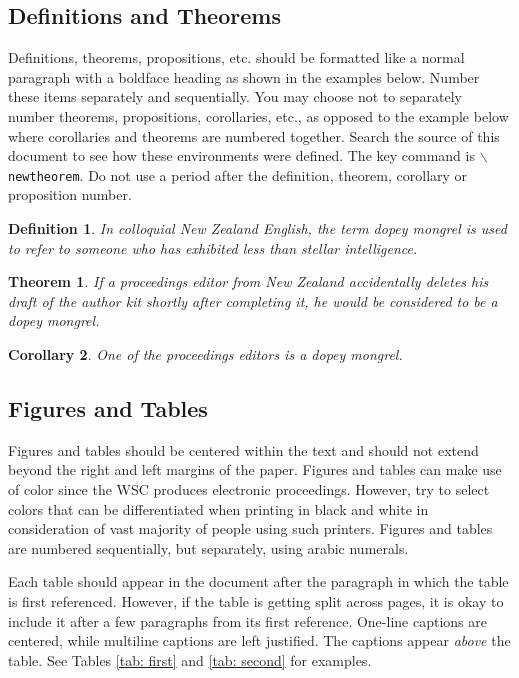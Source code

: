 \documentclass{wscpaperproc}
\theoremstyle{wsc}
\newtheorem{theorem}{Theorem}
\newtheorem{corollary}[theorem]{Corollary}
\newtheorem{definition}{Definition}
\begin{document}
\subsection{Definitions and Theorems}
Definitions, theorems, propositions, etc. should be formatted like a normal paragraph with a boldface heading as shown in the examples below. Number
these items separately and sequentially. You may choose not to separately number theorems, propositions, corollaries, etc., as opposed to the example below where corollaries and theorems are numbered together. Search the source of this document to see how these environments were defined. The key
command is {\tt $\backslash$newtheorem}. Do not use a period after the definition, theorem, corollary or proposition number.

\begin{definition}
In colloquial New Zealand English, the term {\em dopey mongrel} is used to refer to someone who has exhibited less than stellar intelligence.
\end{definition}

\begin{theorem}
If a proceedings editor from New Zealand accidentally deletes his draft of the author kit shortly after completing it, he would be considered to be a dopey mongrel.
\end{theorem}

\begin{corollary}
One of the proceedings editors is a dopey mongrel.
\end{corollary}

\subsection{Figures and Tables}
\label{sec:graphics}
Figures and tables should be centered within the text and should not extend beyond the right and left margins of the paper.
Figures and tables can make use of color since the WSC produces electronic proceedings.
However, try to select colors that can be differentiated when printing in black and white in consideration of vast majority of people using such printers.
Figures and tables are numbered sequentially, but separately, using arabic numerals.

Each table should appear in the document after the paragraph in which the table is first referenced. However, if the table is getting split across pages, it is okay to include it after a few paragraphs from its first reference.
One-line captions are centered, while multiline captions are left justified.
The captions appear {\em above} the table. See Tables \ref{tab: first} and \ref{tab: second} for examples.
\end{document}

